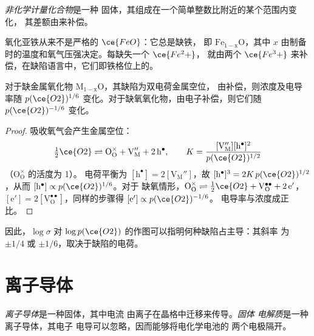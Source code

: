 \begin{definition}[非化学计量化合物]\label{def:b3:solid-state:non-stoichiometric}
\emph{非化学计量化合物}是一种
固体，其组成在一个简单整数比附近的某个范围内变化，
其差额由来补偿。
\end{definition}

氧化亚铁从来不是严格的 $\ce{FeO}$：它总是缺铁，
即 $\mathrm{Fe_{1-x}O}$，其中 $x$ 由制备时的温度和氧气压强决定。每缺失一个 $\ce{Fe^2+}$，
就由两个 $\ce{Fe^3+}$ 来补偿，在缺陷语言中，它们即铁格位上的。

\begin{proposition}[电导率与氧气压强]\label{prop:b3:solid-state:brouwer}
对于缺金属氧化物 $\mathrm{M_{1-x}O}$，其缺陷为双电荷金属空位，
由补偿，则浓度及电导率随
$p(\ce{O2})^{1/6}$ 变化。对于缺氧氧化物，由电子补偿，则它们随
$p(\ce{O2})^{-1/6}$ 变化。
\end{proposition}

\begin{proof}
吸收氧气会产生金属空位：
\[
  \tfrac12\ce{O2} \rightleftharpoons \mathrm{O_O^{\times} + V_M'' + 2\,h^{\bullet}}, \qquad K = \frac{[\mathrm{V_M''}][\mathrm h^\bullet]^2}{p(\ce{O2})^{1/2}}
\]
（$\mathrm{O_O^{\times}}$ 的活度为 1）。
电荷平衡为 $[\mathrm h^\bullet] = 2[\mathrm{V_M''}]$，故 $[\mathrm h^\bullet]^3 = 2K\,p(\ce{O2})^{1/2}$，从而 $[\mathrm h^\bullet] \propto p(\ce{O2})^{1/6}$。对于
缺氧情形，$\mathrm{O_O^{\times}} \rightleftharpoons \tfrac12\ce{O2} + \mathrm{V_O^{\bullet\bullet} + 2\,e'}$，$[\mathrm e'] = 2[\mathrm{V_O^{\bullet\bullet}}]$，同样的步骤得 $[\mathrm e'] \propto p(\ce{O2})^{-1/6}$。
电导率与浓度成正比。
\end{proof}

因此，$\log\sigma$ 对 $\log p(\ce{O2})$ 的作图可以指明何种缺陷占主导：其斜率
为 $\pm 1/4$ 或 $\pm 1/6$，取决于缺陷的电荷。

\section{离子导体}

\begin{definition}[离子导体]\label{def:b3:solid-state:ionic-conductor}
\emph{离子导体}是一种固体，其中电流
由离子在晶格中迁移来传导。\emph{固体
电解质}是一种离子导体，其电子
电导可以忽略，因而能够将电化学电池的
两个电极隔开。
\end{definition}

